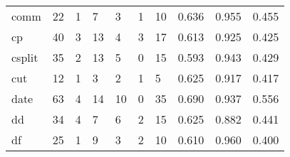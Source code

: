 \begin{longtable}{lp{2.0cm}p{2.0cm}p{2.0cm}p{2.0cm}p{2.0cm}p{2.0cm}p{2.0cm}p{2.0cm}p{2.0cm}}
comm      &                     22 &                                             1 &                                            7 &                                           3 &                                            1 &                                         10 &                                0.636 &                                  0.955 &                                0.455 \\
cp        &                     40 &                                             3 &                                           13 &                                           4 &                                            3 &                                         17 &                                0.613 &                                  0.925 &                                0.425 \\
csplit    &                     35 &                                             2 &                                           13 &                                           5 &                                            0 &                                         15 &                                0.593 &                                  0.943 &                                0.429 \\
cut       &                     12 &                                             1 &                                            3 &                                           2 &                                            1 &                                          5 &                                0.625 &                                  0.917 &                                0.417 \\
date      &                     63 &                                             4 &                                           14 &                                          10 &                                            0 &                                         35 &                                0.690 &                                  0.937 &                                0.556 \\
dd        &                     34 &                                             4 &                                            7 &                                           6 &                                            2 &                                         15 &                                0.625 &                                  0.882 &                                0.441 \\
df        &                     25 &                                             1 &                                            9 &                                           3 &                                            2 &                                         10 &                                0.610 &                                  0.960 &                                0.400 \\

\end{longtable}
